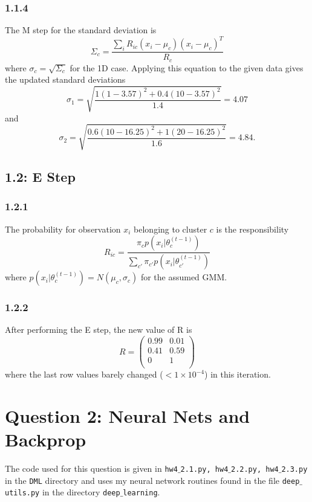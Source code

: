\documentclass[12pt]{amsart}
\begin{document}
\subsubsection*{1.1.4}
The M step for the standard deviation is
\begin{equation}
\Sigma_c = \frac{\sum_i R_{ic}(x_i - \mu_c)(x_i - \mu_c)^T}{R_c}
\end{equation}
where $\sigma_c = \sqrt{\Sigma_c}$ for the 1D case.  Applying this equation to the given data gives the updated standard deviations
\begin{equation}
\sigma_1 = \sqrt{\frac{1(1-3.57)^2 + 0.4(10-3.57)^2}{1.4}} = 4.07
\end{equation}
and
\begin{equation}
\sigma_2 = \sqrt{\frac{0.6(10-16.25)^2 + 1(20-16.25)^2}{1.6}} = 4.84.
\end{equation}

\subsection*{1.2: E Step}

\subsubsection*{1.2.1}
The probability for observation $x_i$ belonging to cluster $c$ is the responsibility
\begin{equation}
R_{ic} = \frac{\pi_c p(x_i | \theta_c^{(t-1)})}{\sum_{c'}\pi_{c'} p(x_i | \theta_{c'}^{(t-1)})}
\end{equation}
where $p(x_i | \theta_c^{(t-1)}) = N(\mu_c,\sigma_c)$ for the assumed GMM.

\subsubsection*{1.2.2}
After performing the E step, the new value of R is
\begin{equation}
R = 
\begin{pmatrix}
    0.99  & 0.01 \\
    0.41  & 0.59 \\
    0       & 1      \\
\end{pmatrix}
\end{equation}
where the last row values barely changed ($< 1 \times 10^{-4}$) in this iteration.

\section{Question 2: Neural Nets and Backprop}
The code used for this question is given in {\tt hw4$\_$2.1.py, hw4$\_$2.2.py, hw4$\_$2.3.py} in the {\tt DML} directory and uses my neural network routines found in the file {\tt deep$\_$utils.py} in the directory {\tt deep$\_$learning}.
\end{document}

